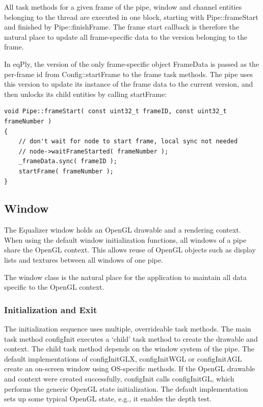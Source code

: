 \documentclass[10pt,a4]{scrartcl}
\begin{document}
All task methods for a given frame of the pipe, window and channel
entities belonging to the thread are executed in one block, starting
with \textsf{Pipe::frameStart} and finished by
\textsf{Pipe::finishFrame}. The frame start callback is therefore the
natural place to update all frame-specific data to the version belonging
to the frame. 

In \textsf{eqPly}, the version of the only frame-specific object
\textsf{FrameData} is passed as the per-frame id from
\textsf{Config::startFrame} to the frame task methods. The pipe uses
this version to update its instance of the frame data to the current
version, and then unlocks its child entities by calling
\textsf{startFrame}:

{\footnotesize\begin{lstlisting}
void Pipe::frameStart( const uint32_t frameID, const uint32_t frameNumber )
{
    // don't wait for node to start frame, local sync not needed
    // node->waitFrameStarted( frameNumber );
    _frameData.sync( frameID );
    startFrame( frameNumber );
}
\end{lstlisting}}


\subsection{Window}

The Equalizer window holds an OpenGL drawable and a rendering
context. When using the default window initialization functions, all
windows of a pipe share the OpenGL context. This allows reuse of OpenGL
objects such as display lists and textures between all windows of one
pipe.

The window class is the natural place for the application to maintain
all data specific to the OpenGL context.

\subsubsection{Initialization and Exit}

The initialization sequence uses multiple, overrideable task
methods. The main task method \textsf{configInit} executes a `child'
task method to create the drawable and context. The child task method
depends on the window system of the pipe. The default implementations of
\textsf{configInitGLX}, \textsf{configInitWGL} or \textsf{configInitAGL}
create an on-screen window using OS-specific methods. If the OpenGL
drawable and context were created successfully, \textsf{configInit} calls
\textsf{configInitGL}, which performs the generic OpenGL
state initialization. The default implementation sets up some typical
OpenGL state, e.g., it enables the depth test.
\end{document}
